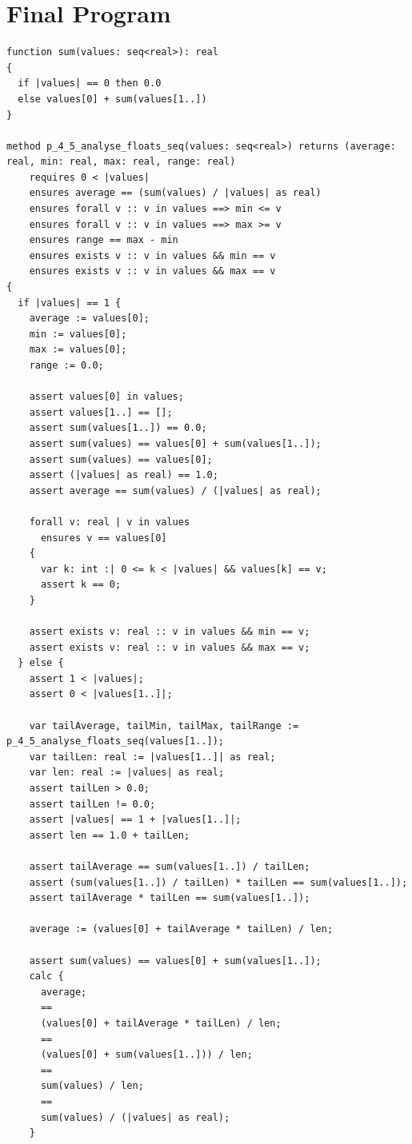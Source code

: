 \documentclass{article}
\begin{document}
\section*{Final Program}
\begin{lstlisting}
function sum(values: seq<real>): real
{
  if |values| == 0 then 0.0
  else values[0] + sum(values[1..])
}

method p_4_5_analyse_floats_seq(values: seq<real>) returns (average: real, min: real, max: real, range: real)
	requires 0 < |values|
	ensures average == (sum(values) / |values| as real)
	ensures forall v :: v in values ==> min <= v
	ensures forall v :: v in values ==> max >= v
	ensures range == max - min
	ensures exists v :: v in values && min == v
	ensures exists v :: v in values && max == v
{
  if |values| == 1 {
    average := values[0];
    min := values[0];
    max := values[0];
    range := 0.0;

    assert values[0] in values;
    assert values[1..] == [];
    assert sum(values[1..]) == 0.0;
    assert sum(values) == values[0] + sum(values[1..]);
    assert sum(values) == values[0];
    assert (|values| as real) == 1.0;
    assert average == sum(values) / (|values| as real);

    forall v: real | v in values
      ensures v == values[0]
    {
      var k: int :| 0 <= k < |values| && values[k] == v;
      assert k == 0;
    }

    assert exists v: real :: v in values && min == v;
    assert exists v: real :: v in values && max == v;
  } else {
    assert 1 < |values|;
    assert 0 < |values[1..]|;

    var tailAverage, tailMin, tailMax, tailRange := p_4_5_analyse_floats_seq(values[1..]);
    var tailLen: real := |values[1..]| as real;
    var len: real := |values| as real;
    assert tailLen > 0.0;
    assert tailLen != 0.0;
    assert |values| == 1 + |values[1..]|;
    assert len == 1.0 + tailLen;

    assert tailAverage == sum(values[1..]) / tailLen;
    assert (sum(values[1..]) / tailLen) * tailLen == sum(values[1..]);
    assert tailAverage * tailLen == sum(values[1..]);

    average := (values[0] + tailAverage * tailLen) / len;

    assert sum(values) == values[0] + sum(values[1..]);
    calc {
      average;
      ==
      (values[0] + tailAverage * tailLen) / len;
      ==
      (values[0] + sum(values[1..])) / len;
      ==
      sum(values) / len;
      ==
      sum(values) / (|values| as real);
    }


\end{lstlisting}
\end{document}
